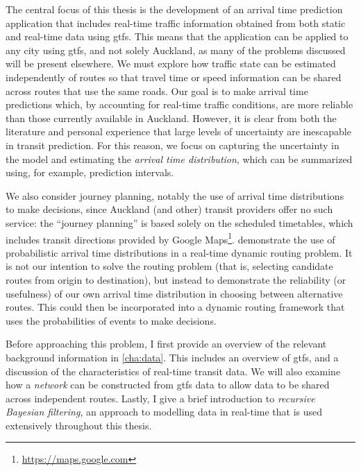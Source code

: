 The central focus of this thesis is the development of an arrival time prediction application that includes real-time traffic information obtained from both static and real-time data using \gls{gtfs}. This means that the application can be applied to any city using \gls{gtfs}, and not solely Auckland, as many of the problems discussed will be present elsewhere. We must explore how traffic state can be estimated independently of routes so that travel time or speed information can be shared across routes that use the same roads. Our goal is to make arrival time predictions which, by accounting for real-time traffic conditions, are more reliable than those currently available in Auckland. However, it is clear from both the literature and personal experience that large levels of uncertainty are inescapable in transit prediction. For this reason, we focus on capturing the uncertainty in the model and estimating the \emph{arrival time distribution}, which can be summarized using, for example, prediction intervals.


We also consider journey planning, notably the use of arrival time distributions to make decisions, since Auckland (and other) transit providers offer no such service: the ``journey planning'' is based solely on the scheduled timetables, which includes transit directions provided by Google Maps\footnote{\url{https://maps.google.com}}.  demonstrate the use of probabilistic arrival time distributions in a real-time dynamic routing problem. It is not our intention to solve the routing problem (that is, selecting candidate routes from origin to destination), but instead to demonstrate the reliability (or usefulness) of our own arrival time distribution in choosing between alternative routes. This could then be incorporated into a dynamic routing framework that uses the probabilities of events to make decisions.


Before approaching this problem, I first provide an overview of the relevant background information in \cref{cha:data}. This includes an overview of \gls{gtfs}, and a discussion of the characteristics of real-time transit data. We will also examine how a \emph{network} can be constructed from \gls{gtfs} data to allow data to be shared across independent routes. Lastly, I give a brief introduction to \emph{recursive Bayesian filtering}, an approach to modelling data in real-time that is used extensively throughout this thesis.



